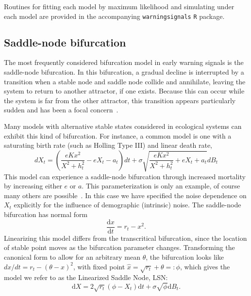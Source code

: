 \documentclass[authoryear, preprint,review,12pt]{elsarticle}
\newcommand{\ud}{\mathrm{d}}
\begin{document}
Routines for fitting each model by maximum likelihood and simulating under each model are provided in the accompanying \texttt{warningsignals} \texttt{R} package.   

\subsection{Saddle-node bifurcation}
The most frequently considered bifurcation model in early warning signals is the saddle-node bifurcation.  
In this bifurcation, a gradual decline is interrupted by a transition when a stable node and saddle node collide and annihilate, 
leaving the system to return to another attractor, if one exists.  
Because this can occur while the system is far from the other attractor, 
this transition appears particularly sudden and has been a focal concern~\citep{Scheffer2001, Scheffer2009}.  

Many models with alternative stable states considered in ecological systems can exhibit this kind of bifurcation.
For instance, a common model is one with a saturating birth rate (such as Holling Type III) and linear death rate, 
\begin{equation}
dX_t = \left( \frac{e K x^2}{X^2 + h_t^2} - e X_t - a_t\right) dt + \sigma \sqrt{ \frac{e K x^2}{X^2 + h_t^2} + e X_t + a_t} dB_t \label{ass}
\end{equation}
This model can experience a saddle-node bifurcation through increased mortality by increasing either $e$ or $a$. 
This parameterization is only an example, of course many others are possible~\citep{Scheffer2009a, Scheffer2001, Strogatz2001a, Guckenheimer1983}.  
In this case we have specified the noise dependence on $X_t$ explicitly for the influence of demographic (intrinsic) noise.
The saddle-node bifurcation has normal form
\begin{equation}
\frac{\ud x}{\ud t} = r_t- x^2.
\label{saddle-node}
\end{equation}
Linearizing this model differs from the transcritical bifurcation,
since the location of stable point moves as the bifurcation parameter changes.
Transforming the canonical form to allow for an arbitrary mean $\theta$,
the bifurcation looks like $ dx/dt = r_t- (\theta-x)^2 $, with fixed point $\hat x = \sqrt{r_t} +\theta =: \phi$,
which gives the model we refer to as the Linearized Saddle Node, LSN: 
\begin{equation}
\ud X = 2\sqrt{ r_t } (\phi - X_t)\ud t + \sigma\sqrt{\phi } \ud B_t. \label{LSN}
\end{equation}
\end{document}
